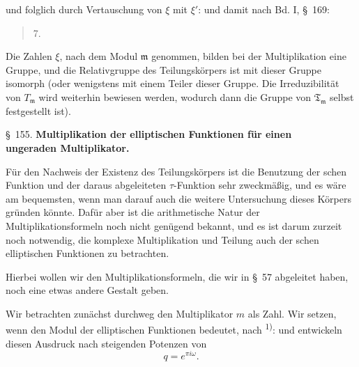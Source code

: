 und folglich durch Vertauschung von $\xi$ mit $\xi'$:
und damit nach Bd. I, \S\ 169:

\begin{quote}
7. 
\end{quote}

Die Zahlen $\xi$, nach dem Modul $\mathfrak{m}$ genommen, bilden bei der Multiplikation eine Gruppe, und die Relativgruppe des Teilungskörpers ist mit dieser Gruppe isomorph (oder wenigstens mit einem Teiler dieser Gruppe. Die Irreduzibilität von $T_{\mathfrak m}$ wird weiterhin bewiesen werden, wodurch dann die Gruppe von $\mathfrak{T}_{\mathfrak m}$ selbst festgestellt ist).

\begin{center}
\S\ 155. \textbf{Multiplikation der elliptischen Funktionen für einen}\\
\textbf{ungeraden Multiplikator.}
\end{center}

Für den Nachweis der Existenz des Teilungskörpers ist die Benutzung der schen Funktion und der daraus abgeleiteten $\tau$-Funktion sehr zweckmäßig, und es wäre am bequemsten, wenn man darauf auch die weitere Untersuchung dieses Körpers gründen könnte. Dafür aber ist die arithmetische Natur der Multiplikationsformeln noch nicht genügend bekannt, und es ist darum zurzeit noch notwendig, die komplexe Multiplikation und Teilung auch der schen elliptischen Funktionen zu betrachten.

Hierbei wollen wir den Multiplikationsformeln, die wir in \S\ 57 abgeleitet haben, noch eine etwas andere Gestalt geben.

Wir betrachten zunächst durchweg den Multiplikator $m$ als  Zahl. Wir setzen, wenn
den Modul der elliptischen Funktionen bedeutet, nach \textsuperscript{1)}\begingroup\renewcommand{\thefootnote}{1)}\endgroup:
und entwickeln diesen Ausdruck nach steigenden Potenzen von
\[
q = e^{\pi i \omega}.
\]
